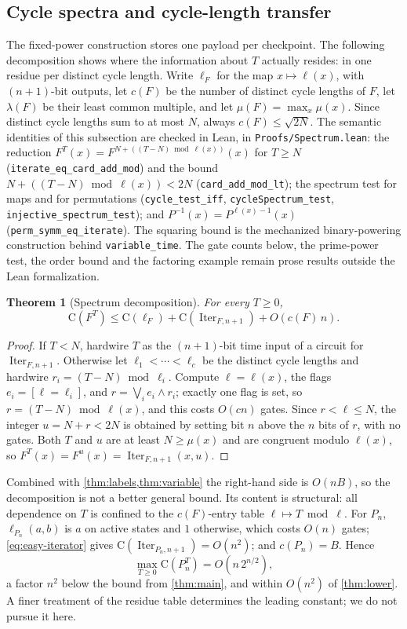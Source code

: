 \documentclass[11pt]{article}
\newtheorem{theorem}{Theorem}[section]
\theoremstyle{definition}
\theoremstyle{remark}
\newcommand{\CC}{\mathrm{C}}
\newcommand{\Iter}{\operatorname{Iter}}
\numberwithin{equation}{section}
\begin{document}
\subsection{Cycle spectra and cycle-length transfer}\label{sec:spectrum}

The fixed-power construction stores one payload per checkpoint.  The
following decomposition shows where the information about $T$ actually
resides: in one residue per distinct cycle length.  Write $\ell_F$ for the
map $x\mapsto\ell(x)$, with $(n+1)$-bit outputs, let $c(F)$ be the number
of distinct cycle lengths of $F$, let $\lambda(F)$ be their least common
multiple, and let $\mu(F)=\max_x\mu(x)$.  Since distinct cycle lengths sum
to at most $N$, always $c(F)\leq\sqrt{2N}$.  The semantic identities of
this subsection are checked in Lean, in \texttt{Proofs/Spectrum.lean}:
the reduction $F^T(x)=F^{N+((T-N)\bmod\ell(x))}(x)$ for $T\geq N$
(\texttt{iterate\_eq\_card\_add\_mod}) and the bound $N+((T-N)\bmod\ell(x))<2N$
(\texttt{card\_add\_mod\_lt}); the spectrum test for maps and for permutations
(\texttt{cycle\_test\_iff}, \texttt{cycleSpectrum\_test},
\texttt{injective\_spectrum\_test}); and $P^{-1}(x)=P^{\ell(x)-1}(x)$
(\texttt{perm\_symm\_eq\_iterate}).  The squaring bound is the mechanized
binary-powering construction behind \texttt{variable\_time}.  The gate
counts below, the prime-power test, the order bound and the factoring
example remain prose results outside the Lean formalization.

\begin{theorem}[Spectrum decomposition]\label{thm:spectrum}
For every $T\geq0$,
\[
 \CC(F^T)\leq\CC(\ell_F)+\CC(\Iter_{F,n+1})+O(c(F)\,n).
\]
\end{theorem}
\begin{proof}
If $T<N$, hardwire $T$ as the $(n+1)$-bit time input of a circuit for
$\Iter_{F,n+1}$.  Otherwise let $\ell_1<\cdots<\ell_c$ be the distinct cycle
lengths and hardwire $r_i=(T-N)\bmod\ell_i$.  Compute $\ell=\ell(x)$, the
flags $e_i=[\ell=\ell_i]$, and $r=\bigvee_ie_i\wedge r_i$; exactly one
flag is set, so $r=(T-N)\bmod\ell(x)$, and this costs $O(cn)$ gates.
Since $r<\ell\leq N$, the integer $u=N+r<2N$ is obtained by setting bit
$n$ above the $n$ bits of $r$, with no gates.  Both $T$ and $u$ are at
least $N\geq\mu(x)$ and are congruent modulo $\ell(x)$, so
$F^T(x)=F^u(x)=\Iter_{F,n+1}(x,u)$.
\end{proof}

Combined with \cref{thm:labels,thm:variable} the right-hand side is
$O(nB)$, so the decomposition is not a better general bound.  Its content
is structural: all dependence on $T$ is confined to the $c(F)$-entry table
$\ell\mapsto T\bmod\ell$.  For $P_n$, $\ell_{P_n}(a,b)$ is $a$ on active
states and $1$ otherwise, which costs $O(n)$ gates; \cref{eq:easy-iterator}
gives $\CC(\Iter_{P_n,n+1})=O(n^2)$; and $c(P_n)=B$.  Hence
\[
 \max_{T\geq0}\CC(P_n^T)=O\!\left(n\,2^{n/2}\right),
\]
a factor $n^2$ below the bound from \cref{thm:main}, and within $O(n^2)$
of \cref{thm:lower}.  A finer treatment of the residue table determines
the leading constant; we do not pursue it here.
\end{document}
